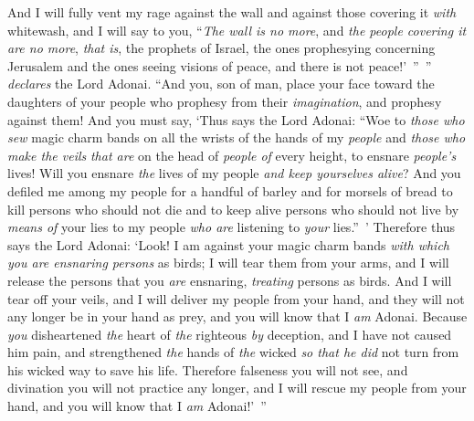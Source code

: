 \begin{biblechapter}
\verse And I will fully vent my rage against the wall and against those covering it \textit{with} whitewash, and I will say to you, “\textit{The wall is no more}, and \textit{the people covering it are no more},
\verse \textit{that is}, the prophets of Israel, the ones prophesying concerning Jerusalem and the ones seeing visions of peace, and there is not peace!’ ” ” \textit{declares} the Lord Adonai.
\verse “And you, son of man, place your face toward the daughters of your people who prophesy from their \textit{imagination}, and prophesy against them!
\verse And you must say, ‘Thus says the Lord Adonai: “Woe to \textit{those who sew} magic charm bands on all the wrists of the hands of my \textit{people} and \textit{those who make the veils} \textit{that are} on the head of \textit{people of} every height, to ensnare \textit{people’s} lives! Will you ensnare \textit{the} lives of my people \textit{and keep yourselves alive}?
\verse And you defiled me among my people for a handful of barley and for morsels of bread to kill persons who should not die and to keep alive persons who should not live by \textit{means of} your lies to my people \textit{who are} listening to \textit{your} lies.” ’
\verse Therefore thus says the Lord Adonai: ‘Look! I am against your magic charm bands \textit{with which you are ensnaring persons} as birds; I will tear them from your arms, and I will release the persons that you \textit{are} ensnaring, \textit{treating} persons as birds.
\verse And I will tear off your veils, and I will deliver my people from your hand, and they will not any longer be in your hand as prey, and you will know that I \textit{am} Adonai.
\verse Because \textit{you} disheartened \textit{the} heart of \textit{the} righteous \textit{by} deception, and I have not caused him pain, and strengthened \textit{the} hands of \textit{the} wicked \textit{so that he did} not turn from his wicked way to save his life.
\verse Therefore falseness you will not see, and divination you will not practice any longer, and I will rescue my people from your hand, and you will know that I \textit{am} Adonai!’ ”
\end{biblechapter}

